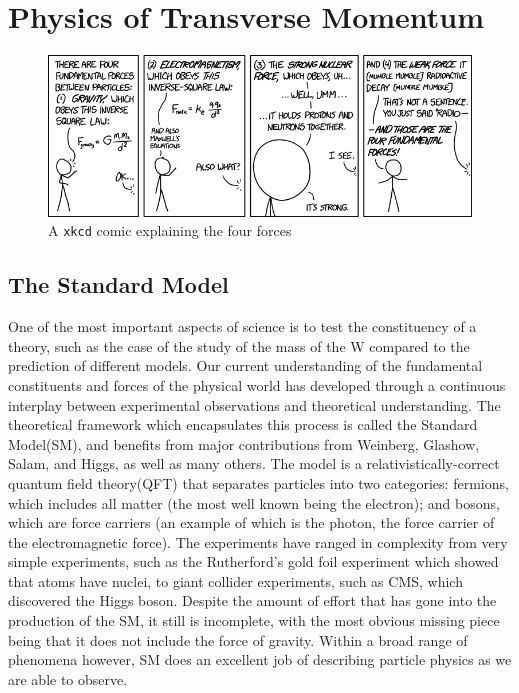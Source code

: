 \chapter{Physics of \texorpdfstring{\Z}{Z} Transverse Momentum}
\label{chapter:theory}
\begin{figure}[!htbp]
    \centering
    \includegraphics[width=\textwidth]{figures/TheoryFigures/fundamental_forcesXKCD.png}
    \caption[Short description of the four forces]{A \texttt{xkcd} comic explaining the four forces\cite{xkcdComic}}
    \label{fig:XKCDComic}
\end{figure}
\section{The Standard Model}
One of the most important aspects of science is to test the constituency of a theory, such as the case of the study of the mass of the W compared to the prediction of different models. Our current understanding of the fundamental constituents and forces of the physical world has developed through a continuous interplay between experimental observations and theoretical understanding.  The theoretical framework which encapsulates this process is called the Standard Model(SM), and benefits from major contributions from Weinberg, Glashow, Salam, and Higgs, as well as many others\cite{glashow1961,weinberg1967,salam1968,higgs1964}. The model is a relativistically-correct quantum field theory(QFT) that separates particles into two categories: fermions, which includes all matter (the most well known being the electron); and bosons, which are force carriers (an example of which is the photon, the force carrier of the electromagnetic force). The experiments have ranged in complexity from very simple experiments, such as the Rutherford's gold foil experiment\cite{rutherford1911} which showed that atoms have nuclei, to giant collider experiments, such as CMS, which discovered the Higgs boson. Despite the amount of effort that has gone into the production of the SM, it still is incomplete, with the most obvious missing piece being that it does not include the force of gravity. Within  a broad range of phenomena however, SM does an excellent job of describing particle physics as we are able to observe.


